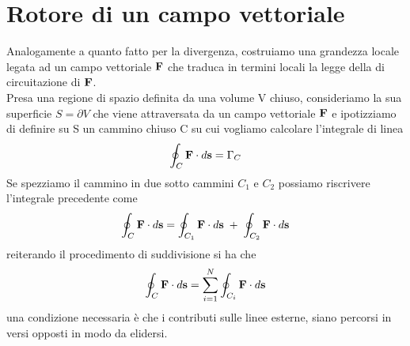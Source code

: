 \section{Rotore di un campo vettoriale }
Analogamente a quanto fatto per la divergenza, costruiamo una grandezza locale legata ad un campo vettoriale $\bold{F}$ che traduca in termini locali la legge della di circuitazione di $\bold{F}$.
\\

\noindent Presa una regione di spazio definita da una volume V chiuso, consideriamo la sua superficie $S = \partial V$ che viene attraversata da un campo vettoriale $\bold{F}$ e ipotizziamo di definire su S un cammino chiuso C su cui vogliamo calcolare l'integrale di linea 
\begin{equation*}
	\oint_{C} \bold{F} \cdot d\bold{s} = \Gamma_{C}
\end{equation*}
Se spezziamo il cammino in due sotto cammini $C_1$ e $C_2$ possiamo riscrivere l'integrale precedente come 
\begin{equation*}
	\oint_{C } \bold{F} \cdot d \bold{s} = \oint_{C_1} \bold{F} \cdot d\bold{s} \;+\; \oint_{C_2}\bold{F} \cdot d\bold{s}
\end{equation*}
reiterando il procedimento di suddivisione si ha che 
\begin{equation*}
	\oint_{C} \bold{F} \cdot d \bold{s} = \sum_{i=1}^N \oint_{C_i} \bold{F} \cdot d \bold{s}
\end{equation*}
una condizione necessaria \`e che i contributi sulle linee esterne, siano percorsi in versi opposti in modo da elidersi.

